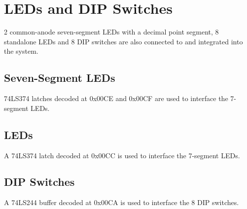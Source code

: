 \section{LEDs and DIP Switches}
2 common-anode seven-segment LEDs with a decimal point segment, 8 standalone LEDs and 8 DIP switches are also connected to and integrated into the system. 

    \subsection{Seven-Segment LEDs}
    74LS374 latches decoded at 0x00CE and 0x00CF are used to interface the 7-segment LEDs.

    \subsection{LEDs}
    A 74LS374 latch decoded at 0x00CC is used to interface the 7-segment LEDs.

    \subsection{DIP Switches}
    A 74LS244 buffer decoded at 0x00CA is used to interface the 8 DIP switches.
